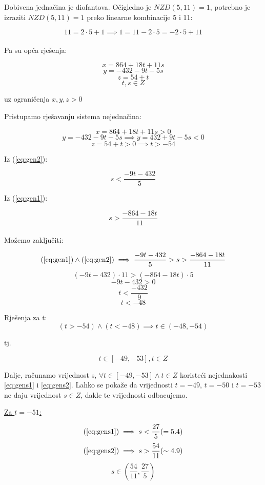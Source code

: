 \documentclass[12pt]{article}
\begin{document}
Dobivena jednačina je diofantova. Očigledno je $NZD(5, 11) = 1$, potrebno je izraziti $NZD(5, 11) = 1$ preko linearne kombinacije 5 i 11:

$$11 = 2 \cdot 5 + 1 \implies 1 = 11 - 2 \cdot 5 = - 2 \cdot 5 + 11$$\\

Pa su opća rješenja:

$$x = 864 + 18t + 11s$$
$$y = -432 - 9t - 5s$$
$$z = 54 + t$$
$$t, s\in Z$$
\begin{center}
uz ograničenja $x, y, z > 0$
\end{center}

Pristupamo rješavanju sistema nejednačina:

\[
x = 864 + 18t + 11s > 0 \label{eq:gen1} \tag{1}
\]
\[
y = -432 - 9t - 5s \implies y = 432 + 9t - 5s < 0 \label{eq:gen2} \tag{2}
\]
$$z = 54 + t > 0 \implies t > - 54$$

Iz (\ref{eq:gen2}):

\[
s < \frac{- 9t - 432}{5} \label{eq:gens1} \tag{A}
\]

Iz (\ref{eq:gen1}):

\[
s > \frac{- 864 - 18t}{11} \label{eq:gens2} \tag{B}
\]\\

Možemo zaključiti:

$$(\ref{eq:gen1}) \land (\ref{eq:gen2}) \implies \frac{- 9t - 432}{5} > s > \frac{- 864 - 18t}{11}$$
$$(- 9t - 432) \cdot 11 > (- 864 - 18t) \cdot 5$$
$$- 9t - 432 > 0$$
$$t < \frac{- 432}{9}$$
$$t < -48$$\vspace{1mm}

Rješenja za t: 
$$(t > -54) \land (t < -48) \implies t\in (-48, -54)$$

tj. 

$$t\in [-49, -53], t\in Z$$\vspace{1mm}

Dalje, računamo vrijednost s, $\forall t\in [-49, -53] \land t\in Z$ koristeći nejednakosti \ref{eq:gens1} i \ref{eq:gens2}. Lahko se pokaže da vrijednosti $t = - 49$, $t = - 50$ i $t = - 53$ ne daju vrijednost $s \in Z$, dakle te vrijednosti odbacujemo.\vspace{1mm}

\underline{Za $t = - 51$:}

$$(\ref{eq:gens1}) \implies s < \frac{27}{5} ( = 5.4)$$
$$(\ref{eq:gens2}) \implies s > \frac{54}{11} ( \sim 4.9)$$
$$s \in (\frac{54}{11}, \frac{27}{5})$$\vspace{1mm}
\end{document}

